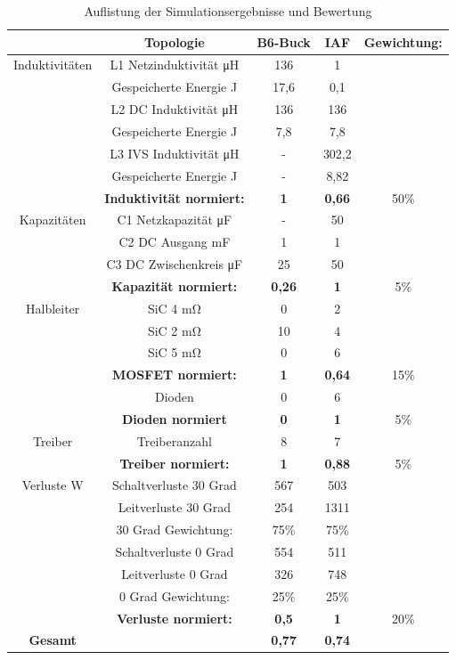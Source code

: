 \begin{table}
	\centering
	\caption{Auflistung der Simulationsergebnisse und Bewertung}
	\begin{tabular}{|c|c|c|c|c|}
		\hline
		& Topologie & B6-Buck & \gls{IAF} & Gewichtung: \\
		\hline
		Induktivitäten& L1 Netzinduktivität \si{\micro \henry}& 136 & 1 &  \\
		\hline
		& Gespeicherte Energie J& 17,6 & 0,1 & \\
		\hline
		& L2 DC Induktivität \si{\micro \henry}& 136 & 136 &  \\
		\hline
		& Gespeicherte Energie J& 7,8 & 7,8 &  \\
		\hline
		& L3 IVS Induktivität \si{\micro \henry}& - & 302,2 &  \\
		\hline
		& Gespeicherte Energie J & - & 8,82 & \\
		\hline
		& \textbf{Induktivität normiert:} & \textbf{1}   & \textbf{0,66} & 50\% \\
		\hline
		Kapazitäten & C1 Netzkapazität \si{\micro \farad}& - & 50 &  \\
		\hline
		& C2 DC Ausgang mF& 1 & 1 &  \\
		\hline
		& C3 DC Zwischenkreis \si{\micro \farad}& 25 & 50 &  \\
		\hline
		& \textbf{Kapazität normiert:} & \textbf{0,26} &  \textbf{1} & 5\% \\
		\hline
		Halbleiter & SiC 4 \si{\milli \ohm} & 0 & 2 &  \\
		\hline
		& SiC 2 \si{\milli \ohm} & 10 & 4 &  \\
		\hline
		& SiC 5 \si{\milli \ohm} & 0 & 6 &  \\
		\hline
		& \textbf{MOSFET normiert:} & \textbf{1} &  \textbf{0,64} & 15\% \\
		\hline
		& Dioden & 0 & 6 &  \\
		\hline
		& \textbf{Dioden normiert} & \textbf{0} & \textbf{1} & 5\% \\
		\hline
		Treiber & Treiberanzahl & 8 & 7 &  \\
		\hline
		& \textbf{Treiber normiert:} & \textbf{1} & \textbf{0,88} & 5\% \\
		\hline
		Verluste W & Schaltverluste 30 Grad & 567 & 503 &  \\
		\hline
		& Leitverluste 30 Grad & 254 & 1311 &  \\
		\hline
		& 30 Grad Gewichtung: & 75\% & 75\% &  \\
		\hline
		& Schaltverluste 0 Grad & 554 & 511 &  \\
		\hline
		& Leitverluste 0 Grad & 326 & 748 &  \\
		\hline
		& 0 Grad Gewichtung: & 25\% & 25\% &  \\
		\hline
		& \textbf{Verluste normiert:} &\textbf{0,5} & \textbf{1} & 20\% \\
		\hline
		\textbf{Gesamt} &  & \textbf{0,77} & \textbf{0,74} & \\
		\hline
	\end{tabular}
	\label{tab:Auswertung}
\end{table}